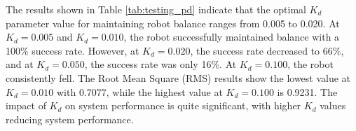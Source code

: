 \begin{enumerate}[label=\Alph*.]
    \hspace*{1em} The results shown in Table \ref{tab:testing_pd} indicate that the optimal $K_d$ parameter value for maintaining robot balance ranges from 0.005 to 0.020. At $K_d = 0.005$ and $K_d = 0.010$, the robot successfully maintained balance with a 100\% success rate. However, at $K_d = 0.020$, the success rate decreased to 66\%, and at $K_d = 0.050$, the success rate was only 16\%. At $K_d = 0.100$, the robot consistently fell. The Root Mean Square (RMS) results show the lowest value at $K_d = 0.010$ with 0.7077, while the highest value at $K_d = 0.100$ is 0.9231. The impact of $K_d$ on system performance is quite significant, with higher $K_d$ values reducing system performance.


\end{enumerate}
